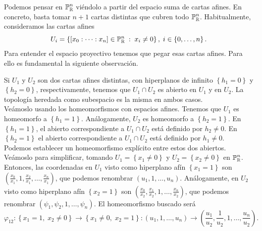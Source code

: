 Podemos pensar en $\displaystyle \mathbb{P}^{n}_{\mathbb{R}} $ viéndolo a partir del espacio suma de cartas afines. En concreto, basta tomar $\displaystyle n + 1 $ cartas distintas que cubren todo $\displaystyle \mathbb{P}^{n}_{\mathbb{R}} $. Habitualmente, consideramos las cartas afines
\[U_{i}= \left\{ \left[x_{0} : \cdots : x_{n}\right] \in \mathbb{P}^{n}_{\mathbb{R}} \; : \; x_{i} \neq 0\right\} , \; i \in \left\{ 0, \ldots, n\right\}  .\]
Para entender el espacio proyectivo tenemos que pegar esas cartas afines. Para ello es fundamental la siguiente observación. 
\begin{observation}
	Si $\displaystyle U_{1} $ y $\displaystyle U_{2} $ son dos cartas afines distintas, con hiperplanos de infinito $\displaystyle \left\{ h_{1}=0\right\}  $ y $\displaystyle \left\{ h_{2}=0\right\}  $, respectivamente, tenemos que $\displaystyle U_{1} \cap U_{2} $ es abierto en $\displaystyle U_{1} $ y en $\displaystyle U_{2} $. La topología heredada como subespacio es la misma en ambos casos. \\

	Veámoslo usando los homeomorfismos con espacios afines. Tenemos que $\displaystyle U_{1} $ es homeomorfo a $\displaystyle \left\{ h_{1} = 1\right\}  $. Análogamente, $\displaystyle U_{2}  $ es homeomorfo a $\displaystyle \left\{ h_{2}=1\right\}  $. En $\displaystyle \left\{ h_{1}=1\right\}  $, el abierto correspondiente a $\displaystyle U_{1} \cap U_{2} $ está definido por $\displaystyle h_{2}\neq 0 $. En $\displaystyle \left\{ h_{2}=1\right\}  $ el abierto correspondiente a $\displaystyle U_{1}\cap U_{2} $ está definido por $\displaystyle h_{1}\neq 0 $. Podemos establecer un homeomorfismo explícito entre estos dos abiertos. \\

	Veámoslo para simplificar, tomando $\displaystyle U_{1}= \left\{ x_{1}\neq 0\right\}  $ y $\displaystyle U_{2} = \left\{ x_{2}\neq 0\right\}  $ en $\displaystyle \mathbb{P}^{n}_{\mathbb{R}} $. Entonces, las coordenadas en $\displaystyle U_{1} $ visto como hiperplano afín $\displaystyle \left\{ x_{1} = 1\right\}  $ son $\displaystyle \left(\frac{x_{0}}{x_{1}}, 1, \frac{x_{2}}{x_{1}}, \ldots, \frac{x_{n}}{x_{1}}\right) $, que podemos renombrar $\displaystyle \left(u_{1}, 1, \ldots, u_{n}\right) $. Análogamente, en $\displaystyle U_{2} $ visto como hiperplano afín $\displaystyle \left\{ x_{2}=1\right\}  $ son
	$\displaystyle \left(\frac{x_{0}}{x_{2}}, \frac{x_{1}}{x_{2}}, 1, \ldots, \frac{x_{n}}{x_{2}}\right) $, que podemos renombrar $\displaystyle \left(\psi_{1}, \psi_{2}, 1, \ldots, \psi_{n}\right) $. El homeomorfismo buscado será
	\[\varphi_{12} : \left\{ x_{1} = 1, \; x_{2}\neq 0\right\} \to \left\{ x_{1}\neq 0, \; x_{2}=1\right\} : \left(u_{1}, 1, \ldots, u_{n}\right)\to \left(\frac{u_{1}}{u_{2}}, \frac{1}{u_{2}}, 1, \ldots, \frac{u_{n}}{u_{2}}\right) .\]
\end{observation}


